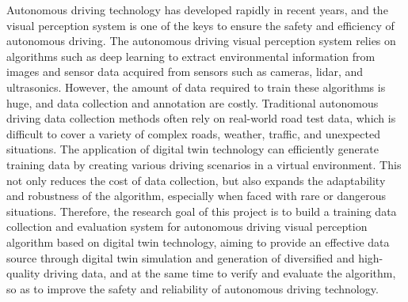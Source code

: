 \begin{abstracten}

Autonomous driving technology has developed rapidly in recent years, and the visual perception system is one of the keys to ensure the safety and efficiency of autonomous driving. The autonomous driving visual perception system relies on algorithms such as deep learning to extract environmental information from images and sensor data acquired from sensors such as cameras, lidar, and ultrasonics. However, the amount of data required to train these algorithms is huge, and data collection and annotation are costly.
Traditional autonomous driving data collection methods often rely on real-world road test data, which is difficult to cover a variety of complex roads, weather, traffic, and unexpected situations. The application of digital twin technology can efficiently generate training data by creating various driving scenarios in a virtual environment. This not only reduces the cost of data collection, but also expands the adaptability and robustness of the algorithm, especially when faced with rare or dangerous situations.
Therefore, the research goal of this project is to build a training data collection and evaluation system for autonomous driving visual perception algorithm based on digital twin technology, aiming to provide an effective data source through digital twin simulation and generation of diversified and high-quality driving data, and at the same time to verify and evaluate the algorithm, so as to improve the safety and reliability of autonomous driving technology.



\end{abstracten}
